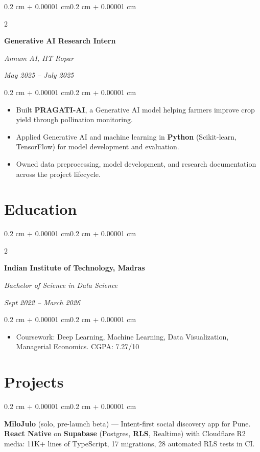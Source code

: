 \documentclass[10pt, letterpaper]{article}
\newenvironment{highlights}{
    \begin{itemize}[
        topsep=0.03 cm,
        parsep=0.03 cm,
        partopsep=0pt,
        itemsep=0pt,
        leftmargin=0.4 cm + 10pt
    ]
}{
    \end{itemize}
}
\newenvironment{onecolentry}{
    \begin{adjustwidth}{0.2 cm + 0.00001 cm}{0.2 cm + 0.00001 cm}
}{
    \end{adjustwidth}
}
\newenvironment{twocolentry}[2][]{
    \onecolentry
    \def\secondColumn{#2}
    \setcolumnwidth{\fill, 4.5 cm}
    \begin{paracol}{2}
}{
    \switchcolumn \raggedleft \secondColumn
    \end{paracol}
    \endonecolentry
}
\let\hrefWithoutArrow\href
\renewcommand{\href}[2]{\hrefWithoutArrow{#1}{\ifthenelse{\equal{#2}{}}{ }{#2 }\raisebox{.15ex}{\footnotesize \faExternalLink*}}}
\begin{document}
        \vspace{0.12 cm}

        \begin{twocolentry}{
        \textit{Annam AI, IIT Ropar}

        \textit{May 2025 -- July 2025}}
            \textbf{Generative AI Research Intern}
            \textit{\href{https://pragati-ai.streamlit.app/}{Live Demo}}
        \end{twocolentry}

        \vspace{0.06 cm}
        \begin{onecolentry}
            \begin{highlights}
                \item Built \textbf{PRAGATI-AI}, a Generative AI model helping farmers improve crop yield through pollination monitoring.
                \item Applied Generative AI and machine learning in \textbf{Python} (Scikit-learn, TensorFlow) for model development and evaluation.
                \item Owned data preprocessing, model development, and research documentation across the project lifecycle.
            \end{highlights}
        \end{onecolentry}

    \section{Education}

        \begin{twocolentry}{
        \textit{Sept 2022 -- March 2026}}
            \textbf{Indian Institute of Technology, Madras}

            \textit{Bachelor of Science in Data Science}
        \end{twocolentry}

        \vspace{0.06 cm}
        \begin{onecolentry}
            \begin{highlights}
                \item Coursework: Deep Learning, Machine Learning, Data Visualization, Managerial Economics. \quad CGPA: 7.27/10
            \end{highlights}
        \end{onecolentry}

    \section{Projects}
        \begin{onecolentry}
            \textbf{MiloJulo} (solo, pre-launch beta) --- Intent-first social discovery app for Pune. \textbf{React Native} on \textbf{Supabase} (Postgres, \textbf{RLS}, Realtime) with Cloudflare R2 media: 11K+ lines of TypeScript, 17 migrations, 28 automated RLS tests in CI.
        \end{onecolentry}
\end{document}
